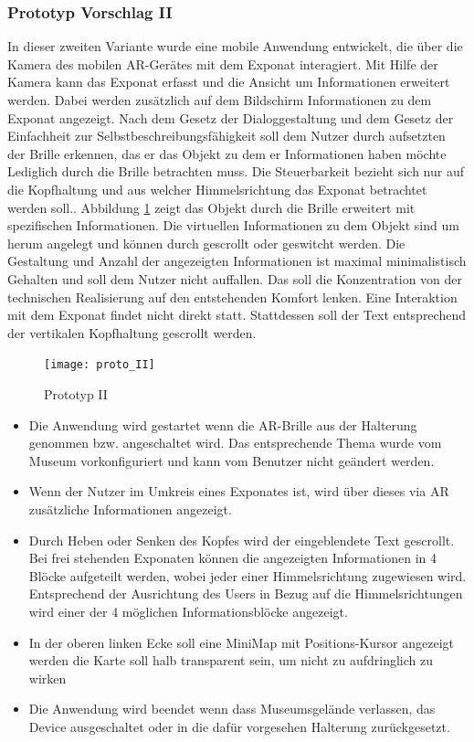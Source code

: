 \documentclass[runningheads,a4paper]{llncs}
\begin{document}
\subsubsection{Prototyp Vorschlag II} \label{chapt:paperprotoII}
In dieser zweiten Variante wurde eine mobile Anwendung entwickelt, die über die Kamera des mobilen AR-Gerätes mit dem Exponat interagiert. Mit Hilfe der Kamera kann das Exponat erfasst und die Ansicht um Informationen erweitert werden. Dabei werden zusätzlich auf dem Bildschirm  Informationen zu dem Exponat angezeigt. Nach dem Gesetz der Dialoggestaltung und dem Gesetz der Einfachheit zur Selbstbeschreibungsfähigkeit soll dem Nutzer durch aufsetzten der Brille erkennen, das er das Objekt zu dem er Informationen haben möchte Lediglich durch die Brille betrachten muss. Die Steuerbarkeit bezieht sich nur auf die Kopfhaltung und aus welcher Himmelsrichtung das Exponat betrachtet werden soll.. Abbildung \ref{fig:prototype_II} zeigt das Objekt durch die Brille erweitert mit spezifischen Informationen. Die  virtuellen Informationen zu dem Objekt sind um herum angelegt und können durch gescrollt oder geswitcht werden.  Die Gestaltung und Anzahl der angezeigten Informationen ist maximal minimalistisch Gehalten und soll dem Nutzer nicht auffallen. Das soll die Konzentration von der technischen Realisierung auf den entstehenden Komfort lenken. Eine Interaktion mit dem Exponat findet nicht direkt statt. Stattdessen soll der Text entsprechend der  vertikalen Kopfhaltung gescrollt werden.

\begin{figure}[H]
	\centering
	\texttt{[image: proto\_II]}
	\caption{Prototyp II}
	\label{fig:prototype_II}
\end{figure} 

\begin{itemize}
	\item Die Anwendung wird gestartet wenn die AR-Brille aus der Halterung genommen bzw. angeschaltet wird.
	\subitem Das entsprechende Thema wurde vom Museum vorkonfiguriert und kann vom Benutzer nicht geändert werden. 
	\item Wenn der Nutzer im Umkreis eines Exponates ist, wird über dieses via AR zusätzliche Informationen angezeigt.
	\item Durch Heben oder Senken des Kopfes wird der eingeblendete Text gescrollt.
	\subitem Bei frei stehenden Exponaten können die angezeigten Informationen in 4 Blöcke aufgeteilt werden, wobei jeder einer Himmelsrichtung zugewiesen wird.
	\subitem Entsprechend der Ausrichtung des Users in Bezug auf die Himmelsrichtungen wird einer der 4 möglichen Informationsblöcke angezeigt.
	\item In der oberen linken Ecke soll eine MiniMap mit Positions-Kursor angezeigt werden
	\subitem die Karte soll halb transparent sein, um nicht zu aufdringlich zu wirken
	\item Die Anwendung wird beendet wenn dass Museumsgelände verlassen, das Device ausgeschaltet oder in die dafür vorgesehen Halterung zurückgesetzt.
	
\end{itemize}
\end{document}

